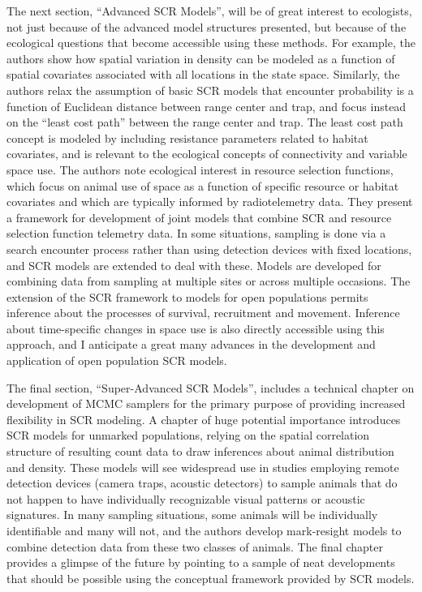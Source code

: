 The
next section, ``Advanced SCR Models'', will be of great interest to
ecologists, not just because of the advanced model structures
presented, but because of the ecological questions that become
accessible using these methods. For example, the authors show how
spatial variation in density can be modeled as a function of spatial
covariates associated with all locations in the state
space. Similarly, the authors relax the assumption of basic SCR models
that encounter probability is a function of Euclidean distance between
range center and trap, and focus instead on the ``least cost path''
between the range center and trap. The least cost path concept is
modeled by including resistance parameters related to habitat
covariates, and is relevant to the ecological concepts of connectivity
and variable space use. The authors note ecological interest in
resource selection functions, which focus on animal use of space as a
function of specific resource or habitat covariates and which are
typically informed by radiotelemetry data. They present a framework
for development of joint models that combine SCR and resource
selection function telemetry data. In some situations, sampling is
done via a search encounter process rather than using detection
devices with fixed locations, and SCR models are extended to deal with
these. Models are developed for combining data from sampling at
multiple sites or across multiple occasions. The extension of the SCR
framework to models for open populations permits inference about the
processes of survival, recruitment and movement. Inference about
time-specific changes in space use is also directly accessible using
this approach, and I anticipate a great many advances in the
development and application of open population SCR models. 


 The final
section, ``Super-Advanced SCR Models'', includes a technical chapter on
development of MCMC samplers for the primary purpose of providing
increased flexibility in SCR modeling. A chapter of huge potential
importance introduces SCR models for unmarked populations, relying on
the spatial correlation structure of resulting count data to draw
inferences about animal distribution and density.  These models will
see widespread use in studies employing remote detection devices
(camera traps, acoustic detectors) to sample animals that do not
happen to have individually recognizable visual patterns or acoustic
signatures. In many sampling situations, some animals will be
individually identifiable and many will not, and the authors develop
mark-resight models to combine detection data from these two classes
of animals.  The final chapter provides a glimpse of the future by
pointing to a sample of neat developments that should be possible
using the conceptual framework provided by SCR models.  


